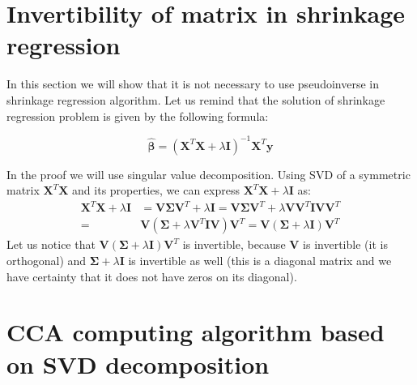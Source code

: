 \begin{appendices}
\newpage
\section{Invertibility of matrix in shrinkage regression}
\label{app:reg}

In this section we will show that it is not necessary to use pseudoinverse in shrinkage regression algorithm. Let us remind that the solution of shrinkage regression problem is given by the following formula:

\begin{equation}\label{eq:shrink}
    \boldsymbol{\hat{\beta}} = (\boldsymbol{X}^T\boldsymbol{X}+\lambda\boldsymbol{I})^{-1}\boldsymbol{X}^T\boldsymbol{y}
\end{equation}

In the proof we will use singular value decomposition. Using SVD of a symmetric matrix $\boldsymbol{X}^T\boldsymbol{X}$ and its properties, we can express $\boldsymbol{X}^T\boldsymbol{X}+\lambda\boldsymbol{I}$ as: 
\begin{equation}\label{eq:inv_proof}
\begin{split}
    \boldsymbol{X}^T\boldsymbol{X} + \lambda\boldsymbol{I}&=\boldsymbol{V}\boldsymbol{\Sigma}\boldsymbol{V}^T + \lambda\boldsymbol{I} = \boldsymbol{V}\boldsymbol{\Sigma}\boldsymbol{V}^T + \lambda\boldsymbol{V}\boldsymbol{V}^T\boldsymbol{I}\boldsymbol{V}\boldsymbol{V}^T \\ 
    = &\boldsymbol{V}(\boldsymbol{\Sigma} + \lambda\boldsymbol{V}^T\boldsymbol{I}\boldsymbol{V})\boldsymbol{V}^T = \boldsymbol{V}(\boldsymbol{\Sigma} + \lambda\boldsymbol{I})\boldsymbol{V}^T 
\end{split}
\end{equation}
Let us notice that $\boldsymbol{V}(\boldsymbol{\Sigma} + \lambda\boldsymbol{I})\boldsymbol{V}^T$ is invertible, because $\boldsymbol{V}$ is invertible (it is orthogonal) and $\boldsymbol{\Sigma} +\lambda\boldsymbol{I}$ is invertible as well (this is a diagonal matrix and we have certainty that it does not have zeros on its diagonal).

\newpage
\section{CCA computing algorithm based on SVD decomposition}
\label{app:cca}


\end{appendices}
